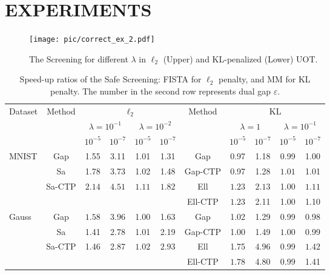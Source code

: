 \documentclass[11pt]{article}
\begin{document}
\section{EXPERIMENTS}

\begin{figure*}[t]
\centering
\texttt{[image: pic/correct\_ex\_2.pdf]}
\caption{The Screening for different $\lambda$ in $\ell_2$ (Upper) and KL-penalized (Lower) UOT.}
\label{Fig:ex2}
\end{figure*}


\begin{table}[t]
\caption{Speed-up ratios of the Safe Screening: FISTA for $\ell_2$ penalty, and MM for KL penalty. The number in the second row represents dual gap $\varepsilon$.}
\label{sample-table}
\centering
\begin{tabular}{l|c|cc|cc|c|cc|cc}
\toprule
Dataset & Method & \multicolumn{4}{c|}{$\ell_2$} & Method & \multicolumn{4}{c}{KL} \\
& & \multicolumn{2}{c}{$\lambda=10^{-1}$} & \multicolumn{2}{c|}{$\lambda=10^{-2}$} & & \multicolumn{2}{c}{$\lambda=1$} & \multicolumn{2}{c}{$\lambda=10^{-1}$} \\
\cmidrule{3-6} \cmidrule{8-11}
& & $10^{-5}$ & $10^{-7}$ & $10^{-5}$ & $10^{-7}$ & & $ 10^{-5}$ & $10^{-7}$ & $ 10^{-5}$ & $10^{-7}$ \\
\midrule
MNIST & Gap & 1.55 & 3.11 & 1.01 & 1.31 & Gap & 0.97 & 1.18 & 0.99 & 1.00 \\
& Sa & 1.78 & 3.73 & 1.02 & 1.48 & Gap-CTP& 0.97 & 1.28 & $\bm{1.01}$ & 1.01 \\
& \!Sa-CTP\! & $\bm{2.14}$ & $\bm{4.51}$ & $\bm{1.11}$ & $\bm{1.82}$ & Ell & $\bm{1.23}$ & $\bm{2.13}$ & 1.00 & $\bm {1.11}$ \\
& & & & & & \!\!Ell-CTP\!\! & $\bm{1.23}$ & 2.11 & 1.00 & 1.10 \\
\midrule
Gauss & Gap & $\bm {1.58}$ & $\bm {3.96}$ & 1.00 & 1.63 & Gap & 1.02 & 1.29 & 0.99 & 0.98 \\
& Sa & 1.41 & 2.78 & 1.01 & 2.19 & Gap-CTP & 1.00 & 1.49 & $\bm{1.00}$ & 0.99 \\
& Sa-CTP & 1.46 & 2.87 & $\bm{1.02}$ & $\bm{2.93}$ & Ell & 1.75 & $\bm{4.96}$ & 0.99 & $\bm{1.42}$ \\
& & & & & & \!\!Ell-CTP\!\! & $\bm{1.78}$ & 4.80 & 0.99 & 1.41 \\
\bottomrule
\end{tabular}
\end{table}
\end{document}

